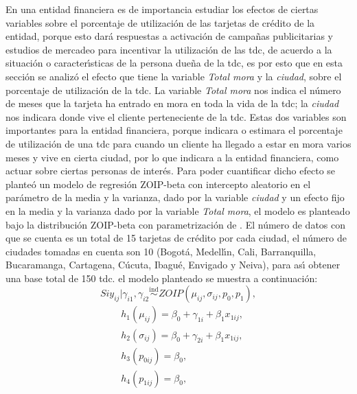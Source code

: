 En una entidad financiera es de importancia estudiar los efectos de ciertas variables sobre el porcentaje de utilizaci\'{o}n de las tarjetas de cr\'{e}dito de la entidad, porque esto dar\'{a} respuestas a activaci\'{o}n de campa\~{n}as publicitarias y estudios de mercadeo para incentivar la utilizaci\'{o}n de las tdc, de acuerdo a la situaci\'{o}n o caracter\'{\i}sticas de la persona due\~{n}a de la tdc, es por esto que en esta secci\'{o}n se analiz\'{o} el efecto que tiene la variable \textsl{Total mora} y la \textsl{ciudad}, sobre el porcentaje de utilizaci\'{o}n de la tdc. La variable \textsl{Total mora} nos indica el n\'{u}mero de meses que la tarjeta ha entrado en mora en toda la vida de la tdc; la \textsl{ciudad} nos indicara donde vive el cliente perteneciente de la tdc. Estas dos variables son importantes para la entidad financiera, porque indicara o estimara el porcentaje de utilizaci\'{o}n de una tdc para cuando un cliente ha llegado a estar en mora varios meses y vive en cierta ciudad, por lo que indicara a la entidad financiera, como actuar sobre ciertas personas de inter\'{e}s. Para poder cuantificar dicho efecto se plante\'{o} un modelo de regresi\'{o}n ZOIP-beta con intercepto aleatorio en el par\'{a}metro de la media y la varianza, dado por la variable \textsl{ciudad} y un efecto fijo en la media y la varianza dado por la variable \textsl{Total mora}, el modelo es planteado bajo la distribuci\'{o}n ZOIP-beta con parametrizaci\'{o}n de \cite{Stasinopoulos2}. El n\'{u}mero de datos con que se cuenta es un total de 15 tarjetas de cr\'{e}dito por cada ciudad, el n\'{u}mero de ciudades tomadas en cuenta son 10 (Bogot\'{a}, Medell\'{\i}n, Cali, Barranquilla, Bucaramanga, Cartagena, C\'{u}cuta, Ibagu\'{e}, Envigado y Neiva), para as\'{\i} obtener una base total de 150 tdc. el modelo planteado se muestra a continuaci\'{o}n:
\[
Si y_{ij}| \gamma_{i1},\gamma_{i2} \overset{\text{ind}}{\sim} ZOIP(\mu_{ij},\sigma_{ij},p_0, p_1),
\]
\begin{equation}
\begin{split}
&h_1(\mu_{ij})=\beta_0+\gamma_{1i}+\beta_1 x_{1ij},\\
&h_2(\sigma_{ij})=\beta_0+\gamma_{2i}+\beta_1 x_{1ij},\\
&h_3(p_{0ij})=\beta_0,\\
&h_4(p_{1ij}) =\beta_0,
\end{split}
\label{A_eq_reg_mix}
\end{equation}

